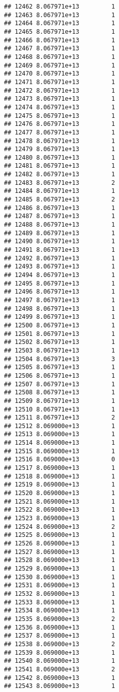 \documentclass[
]{article}
\begin{document}
\begin{verbatim}
## 12462 8.067971e+13         1
## 12463 8.067971e+13         1
## 12464 8.067971e+13         1
## 12465 8.067971e+13         1
## 12466 8.067971e+13         1
## 12467 8.067971e+13         1
## 12468 8.067971e+13         1
## 12469 8.067971e+13         1
## 12470 8.067971e+13         1
## 12471 8.067971e+13         1
## 12472 8.067971e+13         1
## 12473 8.067971e+13         1
## 12474 8.067971e+13         1
## 12475 8.067971e+13         1
## 12476 8.067971e+13         1
## 12477 8.067971e+13         1
## 12478 8.067971e+13         1
## 12479 8.067971e+13         1
## 12480 8.067971e+13         1
## 12481 8.067971e+13         1
## 12482 8.067971e+13         1
## 12483 8.067971e+13         2
## 12484 8.067971e+13         1
## 12485 8.067971e+13         2
## 12486 8.067971e+13         1
## 12487 8.067971e+13         1
## 12488 8.067971e+13         1
## 12489 8.067971e+13         1
## 12490 8.067971e+13         1
## 12491 8.067971e+13         1
## 12492 8.067971e+13         1
## 12493 8.067971e+13         1
## 12494 8.067971e+13         1
## 12495 8.067971e+13         1
## 12496 8.067971e+13         1
## 12497 8.067971e+13         1
## 12498 8.067971e+13         1
## 12499 8.067971e+13         1
## 12500 8.067971e+13         1
## 12501 8.067971e+13         1
## 12502 8.067971e+13         1
## 12503 8.067971e+13         1
## 12504 8.067971e+13         3
## 12505 8.067971e+13         1
## 12506 8.067971e+13         1
## 12507 8.067971e+13         1
## 12508 8.067971e+13         1
## 12509 8.067971e+13         1
## 12510 8.067971e+13         1
## 12511 8.067971e+13         2
## 12512 8.069000e+13         1
## 12513 8.069000e+13         1
## 12514 8.069000e+13         1
## 12515 8.069000e+13         1
## 12516 8.069000e+13         0
## 12517 8.069000e+13         1
## 12518 8.069000e+13         1
## 12519 8.069000e+13         1
## 12520 8.069000e+13         1
## 12521 8.069000e+13         1
## 12522 8.069000e+13         1
## 12523 8.069000e+13         1
## 12524 8.069000e+13         2
## 12525 8.069000e+13         1
## 12526 8.069000e+13         1
## 12527 8.069000e+13         1
## 12528 8.069000e+13         1
## 12529 8.069000e+13         1
## 12530 8.069000e+13         1
## 12531 8.069000e+13         1
## 12532 8.069000e+13         1
## 12533 8.069000e+13         1
## 12534 8.069000e+13         1
## 12535 8.069000e+13         2
## 12536 8.069000e+13         1
## 12537 8.069000e+13         1
## 12538 8.069000e+13         2
## 12539 8.069000e+13         1
## 12540 8.069000e+13         1
## 12541 8.069000e+13         2
## 12542 8.069000e+13         1
## 12543 8.069000e+13         1

\end{verbatim}
\end{document}
